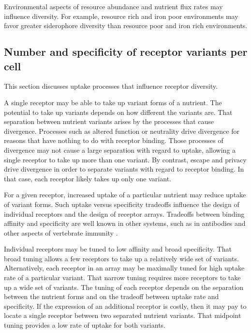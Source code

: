 \documentclass[\mydocfontsize]{article}
\begin{document}
\begin{multicols}{2}
Environmental aspects of resource abundance and nutrient flux rates may influence diversity. For example, resource rich and iron poor environments may favor greater siderophore diversity than resource poor and iron rich environments. 

\subsection{Number and specificity of receptor variants per cell} 

This section discusses uptake processes that influence receptor diversity.

 A single receptor may be able to take up variant forms of a nutrient. The potential to take up variants depends on how different the variants are. That separation between nutrient variants arises by the processes that cause divergence. Processes such as altered function or neutrality drive divergence for reasons that have nothing to do with receptor binding. Those processes of divergence may not cause a large separation with regard to uptake, allowing a single receptor to take up more than one variant. By contrast, escape and privacy drive divergence in order to separate variants with regard to receptor binding. In that case, each receptor likely takes up only one variant.  

 For a given receptor, increased uptake of a particular nutrient may reduce uptake of variant forms. Such uptake versus specificity tradeoffs influence the design of individual receptors and the design of receptor arrays. Tradeoffs between binding affinity and specificity are well known in other systems, such as in antibodies and other aspects of vertebrate immunity \autocite{frank02immunology}.

Individual receptors may be tuned to low affinity and broad specificity. That broad tuning allows a few receptors to take up a relatively wide set of variants. Alternatively, each receptor in an array may be maximally tuned for high uptake rate of a particular variant. That narrow tuning requires more receptors to take up a wide set of variants. The tuning of each receptor depends on the separation between the nutrient forms and on the tradeoff between uptake rate and specificity. If the expression of an additional receptor is costly, then it may pay to locate a single receptor between two separated nutrient variants. That midpoint tuning provides a low rate of uptake for both variants.


\end{multicols}
\end{document}
